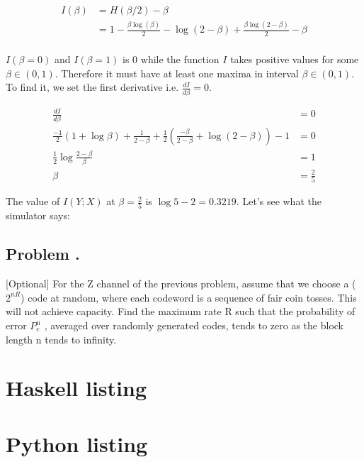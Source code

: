 \documentclass{article}
\newcounter{ProblemNum}
\renewcommand{\theProblemNum}{\arabic{ProblemNum}}
\newcommand*{\anyproblem}[1]{\newpage\subsection*{#1}}
\newcommand*{\problem}[1]{\stepcounter{ProblemNum} %
   \anyproblem{Problem \theProblemNum. \; #1}}
\begin{document}
\begin{align}
    I(\beta) &= H(\beta/2) - \beta  \\
    &= 1 - \frac{\beta \log(\beta)}{2} - \log(2 - \beta) +
    \frac{\beta\log(2-\beta)}{2} - \beta \\
\end{align}

$I(\beta=0)$ and $I(\beta=1)$ is 0 while the function $I$ takes positive values
for some $\beta \in (0, 1)$. Therefore it must have at least one maxima in
interval $\beta \in (0, 1)$. To find it, we set the first derivative i.e.
$\frac{dI}{d\beta} = 0$.

\begin{align}
    \frac{dI}{d\beta} &= 0 \\
    \frac{-1}{2}\left( 1 + \log \beta \right) + \frac{1}{2-\beta} + \frac{1}{2}
    \left( \frac{-\beta}{2-\beta} + \log (2 - \beta) \right) -1 &= 0 \\
    \frac{1}{2} \log \frac{2-\beta}{\beta} &= 1 \\
    \beta &= \frac{2}{5}
\end{align}

The value of $I(Y;X)$ at $\beta=\frac{2}{5}$ is $\log 5 - 2 = 0.3219$. Let's see
what the simulator says:



\problem{}

[Optional] For the Z channel of the previous problem, assume that we choose a
($2^{nR}$) code at random, where each codeword is a sequence of fair coin
tosses. This will not achieve capacity. Find the maximum rate R such that the
probability of error $P_e^n$ , averaged over randomly generated codes, tends to
zero as the block length n tends to infinity.

\appendix
\section{Haskell listing}

\section{Python listing}

\end{document}
